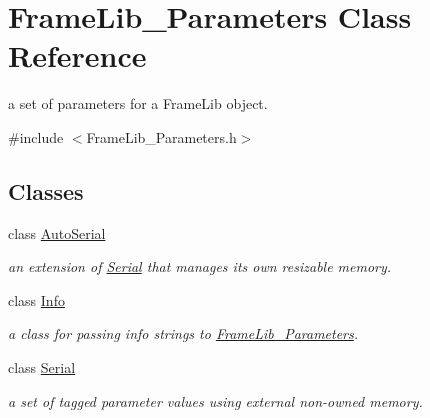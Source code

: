 \hypertarget{class_frame_lib___parameters}{}\section{Frame\+Lib\+\_\+\+Parameters Class Reference}
\label{class_frame_lib___parameters}


a set of parameters for a Frame\+Lib object.  




{\ttfamily \#include $<$Frame\+Lib\+\_\+\+Parameters.\+h$>$}

\subsection*{Classes}
\begin{DoxyCompactItemize}
\item 
class \hyperlink{class_frame_lib___parameters_1_1_auto_serial}{Auto\+Serial}
\begin{DoxyCompactList}\small\item\em an extension of \hyperlink{class_frame_lib___parameters_1_1_serial}{Serial} that manages its own resizable memory. \end{DoxyCompactList}\item 
class \hyperlink{class_frame_lib___parameters_1_1_info}{Info}
\begin{DoxyCompactList}\small\item\em a class for passing info strings to \hyperlink{class_frame_lib___parameters}{Frame\+Lib\+\_\+\+Parameters}. \end{DoxyCompactList}\item 
class \hyperlink{class_frame_lib___parameters_1_1_serial}{Serial}
\begin{DoxyCompactList}\small\item\em a set of tagged parameter values using external non-\/owned memory. \end{DoxyCompactList}\end{DoxyCompactItemize}
